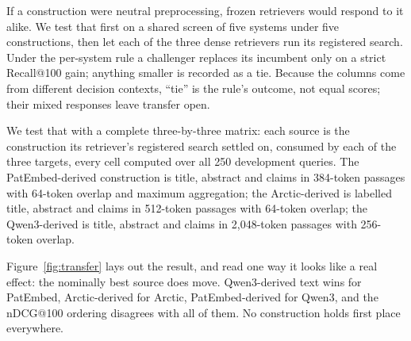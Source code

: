 \documentclass[preprint,11pt,authoryear]{elsarticle}          %
\begin{document}
\begin{table}[!t]
\caption{Development response across frozen retrievers. Shared-screen and per-system-search Recall@100 are produced under different decision rules; their difference is not a before-and-after effect.}
\label{tab:development}
\centering
\small
{}
\end{table}

If a construction were neutral preprocessing, frozen retrievers would respond to it alike. We test that first on a shared screen of five systems under five constructions, then let each of the three dense retrievers run its registered search. Under the per-system rule a challenger replaces its incumbent only on a strict Recall@100 gain; anything smaller is recorded as a tie. Because the columns come from different decision contexts, ``tie'' is the rule's outcome, not equal scores; their mixed responses leave transfer open.

We test that with a complete three-by-three matrix: each source is the construction its retriever's registered search settled on, consumed by each of the three targets, every cell computed over all 250 development queries. The PatEmbed-derived construction is title, abstract and claims in 384-token passages with 64-token overlap and maximum aggregation; the Arctic-derived is labelled title, abstract and claims in 512-token passages with 64-token overlap; the Qwen3-derived is title, abstract and claims in 2{,}048-token passages with 256-token overlap.

Figure~\ref{fig:transfer} lays out the result, and read one way it looks like a real effect: the nominally best source does move. Qwen3-derived text wins for PatEmbed, Arctic-derived for Arctic, PatEmbed-derived for Qwen3, and the nDCG@100 ordering disagrees with all of them. No construction holds first place everywhere.
\end{document}
